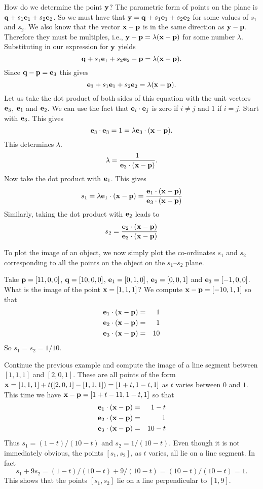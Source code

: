 How do we determine the point ${\bf y}$? The parametric
form of points on the plane is ${\bf q}+s_1{\bf e}_1+s_2{\bf e}_2$. So we must have that
${\bf y}={\bf q}+s_1{\bf e}_1+s_2{\bf e}_2$ for some values of $s_1$ and $s_2$. We also know that
the vector ${\bf x}-{\bf p}$ is in the same direction as ${\bf y}-{\bf p}$. Therefore they must
be multiples, i.e., ${\bf y}-{\bf p}=\lambda({\bf x}-{\bf p})$ for some number $\lambda$.
Substituting in our expression for ${\bf y}$ yields
\[
{\bf q}+s_1{\bf e}_1+s_2{\bf e}_2-{\bf p}=\lambda({\bf x}-{\bf p}).
\]
Since ${\bf q}-{\bf p}={\bf e}_3$ this gives
\[
{\bf e}_3+s_1{\bf e}_1+s_2{\bf e}_2=\lambda({\bf x}-{\bf p}).
\]
Let us take the dot product of both sides of this equation with the unit vectors
${\bf e}_3$, ${\bf e}_1$ and ${\bf e}_2$. We can use the fact that ${\bf e}_i\cdot{\bf e}_j$ is zero
if $i\ne j$ and $1$ if $i=j$. Start with ${\bf e}_3$. This gives
\[
{\bf e}_3\cdot{\bf e}_3 = 1 = \lambda{\bf e}_3\cdot({\bf x}-{\bf p}).
\]
This determines $\lambda$.
\[
\lambda = {{1}\over{{\bf e}_3\cdot({\bf x}-{\bf p})}}.
\]
Now take the dot product with ${\bf e}_1$. This gives
\[
s_1 = \lambda{\bf e}_1\cdot({\bf x}-{\bf p}) = {{{\bf e}_1\cdot({\bf x}-{\bf p})}\over{{\bf e}_3\cdot({\bf x}-{\bf p})}}
\]
Similarly, taking the dot product with ${\bf e}_2$ leads to
\[
s_2= {{{\bf e}_2\cdot({\bf x}-{\bf p})}\over{{\bf e}_3\cdot({\bf x}-{\bf p})}}
\]

To plot the image of an object, we now simply plot the co-ordinates $s_1$ and
$s_2$  corresponding to all the points on the object on the $s_1$--$s_2$ plane.

\begin{example} Take ${\bf p}=[11,0,0]$, ${\bf q}=[10,0,0]$, ${\bf e}_1=[0,1,0]$,
${\bf e}_2=[0,0,1]$ and ${\bf e}_3=[-1,0,0]$. 
What is the image of the point ${\bf x}=[1,1,1]$? 
{\rm 
We compute ${\bf x}-{\bf p}=[-10,1,1]$ so that
\begin{eqnarray*}
{\bf e}_1\cdot({\bf x}-{\bf p}) & = & 1 \\
{\bf e}_2\cdot({\bf x}-{\bf p}) &= & 1 \\
{\bf e}_3\cdot({\bf x}-{\bf p}) &= & 10
\end{eqnarray*}
So $s_1= s_2= 1/10$.}
\end{example}

\begin{example} Continue the previous example and 
compute the image of a line segment
between $[1,1,1]$ and $[2,0,1]$. {\rm 
These are all points of the form ${\bf x}=[1,1,1]+
t([2,0,1]-[1,1,1]) = [1+t,1-t,1]$ as $t$ varies between $0$ and $1$.
This time we have ${\bf x}-{\bf p}=[1+t-11,1-t,1]$ so that
\begin{eqnarray*}
{\bf e}_1\cdot({\bf x}-{\bf p}) &= & 1-t \\
{\bf e}_2\cdot({\bf x}-{\bf p}) &= & 1 \\
{\bf e}_3\cdot({\bf x}-{\bf p}) &= & 10-t
\end{eqnarray*}
Thus $s_1 = (1-t)/(10-t)$ and $s_2=1/(10-t)$. Even though it is not immediately obvious,
the points $[s_1,s_2]$, as $t$ varies, all lie on a line segment. In fact 
\[
s_1 + 9 s_2 = (1-t)/(10-t)+9/(10-t) = (10-t)/(10-t) = 1.
\]
This shows that the points $[s_1,s_2]$ lie on a line perpendicular to $[1,9]$.}
\end{example}


